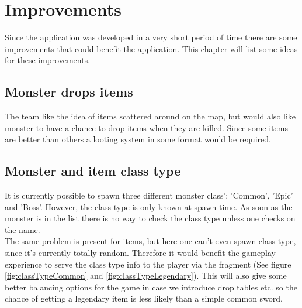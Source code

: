 \pagestyle{Uni}

\chapter{Improvements}

Since the application was developed in a very short period of time there are some improvements that could benefit the application. This chapter will list some ideas for these improvements.

\section{Monster drops items}
The team like the idea of items scattered around on the map, but would also like monster to have a chance to drop items when they are killed. Since some items are better than others a looting system in some format would be required.

\section{Monster and item class type}
It is currently possible to spawn three different monster class': 'Common', 'Epic' and 'Boss'. However, the class type is only known at spawn time. As soon as the monster is in the list there is no way to check the class type unless one checks on the name. \\
The same problem is present for items, but here one can't even spawn class type, since it's currently totally random. Therefore it would benefit the gameplay experience to serve the class type info to the player via the fragment (See figure \ref{fig:classTypeCommon} and \ref{fig:classTypeLegendary}). This will also give some better balancing options for the game in case we introduce drop tables etc. so the chance of getting a legendary item is less likely than a simple common sword.

